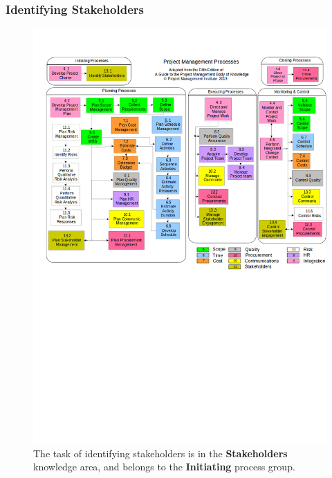 \documentclass{beamer}
\begin{document}
\begin{frame}
\frametitle{Identifying Stakeholders}
\begin{figure}
\caption{The task of identifying stakeholders is in the \textbf{Stakeholders} knowledge area, and belongs to the \textbf{Initiating} process group.}
\vspace{-0.8cm}
\includegraphics[scale=0.3]{mapping}
\end{figure}
\end{frame}
\end{document}
